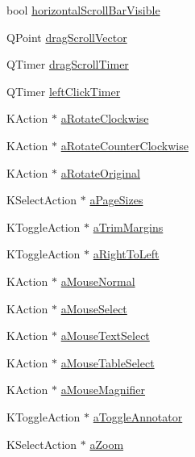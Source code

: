 \begin{DoxyCompactItemize}
\item 
bool \hyperlink{classPageViewPrivate_accc11688dc248fe9a09713b1c1acbe5e}{horizontal\+Scroll\+Bar\+Visible}
\item 
Q\+Point \hyperlink{classPageViewPrivate_a0e761e758cf53fb4147c7e3aa4f06851}{drag\+Scroll\+Vector}
\item 
Q\+Timer \hyperlink{classPageViewPrivate_a2aefc2e5ac5f4824c39593264277ad6a}{drag\+Scroll\+Timer}
\item 
Q\+Timer \hyperlink{classPageViewPrivate_ac0d8482663a19cc6798a2c3b39f78d0e}{left\+Click\+Timer}
\item 
K\+Action $\ast$ \hyperlink{classPageViewPrivate_a389103a18e7590c8ec75c26e23806e51}{a\+Rotate\+Clockwise}
\item 
K\+Action $\ast$ \hyperlink{classPageViewPrivate_a4a8b7b626080698fa1dbf78d60cbff59}{a\+Rotate\+Counter\+Clockwise}
\item 
K\+Action $\ast$ \hyperlink{classPageViewPrivate_ae57bd1f37889d8a28535e877c2fa87ed}{a\+Rotate\+Original}
\item 
K\+Select\+Action $\ast$ \hyperlink{classPageViewPrivate_a5f864847956ada5d8933fe2d28bbc075}{a\+Page\+Sizes}
\item 
K\+Toggle\+Action $\ast$ \hyperlink{classPageViewPrivate_a0ef5e6fe307660bd3fbe6bd999b895a7}{a\+Trim\+Margins}
\item 
K\+Toggle\+Action $\ast$ \hyperlink{classPageViewPrivate_a4f801cbeb2d2c5bb5cccd84f373aeec9}{a\+Right\+To\+Left}
\item 
K\+Action $\ast$ \hyperlink{classPageViewPrivate_aad98b5d46ed82c5423f13cd1a10d0253}{a\+Mouse\+Normal}
\item 
K\+Action $\ast$ \hyperlink{classPageViewPrivate_a9e809032b95484f491dd439198b7bb8e}{a\+Mouse\+Select}
\item 
K\+Action $\ast$ \hyperlink{classPageViewPrivate_a1d8b1716abeb281e68dce858ffda489f}{a\+Mouse\+Text\+Select}
\item 
K\+Action $\ast$ \hyperlink{classPageViewPrivate_a6b679535b8feee220664963bcb7b0b56}{a\+Mouse\+Table\+Select}
\item 
K\+Action $\ast$ \hyperlink{classPageViewPrivate_a48a8cc9cf9c4aa483c79c8f81fc62ea7}{a\+Mouse\+Magnifier}
\item 
K\+Toggle\+Action $\ast$ \hyperlink{classPageViewPrivate_a29f1ef25d86a534e1605ae5e662233b8}{a\+Toggle\+Annotator}
\item 
K\+Select\+Action $\ast$ \hyperlink{classPageViewPrivate_a04f88453f9b09f91cce05b4b6647f2ad}{a\+Zoom}
\item 

\end{DoxyCompactItemize}
